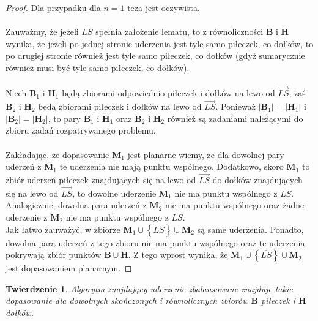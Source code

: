 \documentclass[10pt,a4paper]{article}
\newtheorem{theorem}{Twierdzenie}
\begin{document}
	\begin{proof}
		Dla przypadku dla $n = 1$  teza jest oczywista. \\~\\
		Zauważmy, że jeżeli $LS$ spełnia założenie lematu, to z równoliczności $\mathbf{B}$ i $\mathbf{H}$ wynika, że jeżeli po jednej stronie uderzenia jest tyle samo piłeczek, co dołków, to po drugiej stronie również jest tyle samo piłeczek, co dołków (gdyż sumarycznie również musi być tyle samo piłeczek, co dołków). \\~\\
		Niech $\mathbf{B}_{1}$ i $\mathbf{H}_{1}$ będą zbiorami odpowiednio piłeczek i dołków na lewo od $\overrightarrow{LS}$, zaś $\mathbf{B}_{2}$ i $\mathbf{H}_{2}$ będą zbiorami piłeczek i dołków na lewo od $\overrightarrow{LS}$. Ponieważ $|\mathbf{B}_{1}| = |\mathbf{H}_{1}|$ i $|\mathbf{B}_{2}| = |\mathbf{H}_{2}|$, to pary $\mathbf{B}_{1}$ i $\mathbf{H}_{1}$ oraz $\mathbf{B}_{2}$ i $\mathbf{H}_{2}$ również są zadaniami należącymi do zbioru zadań rozpatrywanego problemu. \\~\\
		Zakładając, że dopasowanie $\mathbf{M}_{1}$ jest planarne wiemy, że dla dowolnej pary uderzeń z $\mathbf{M}_{1}$ te uderzenia nie mają punktu wspólnego. Dodatkowo, skoro $\mathbf{M}_{1}$ to zbiór uderzeń piłeczek znajdujących się na lewo od $\overrightarrow{LS}$ do dołków znajdujących się na lewo od $\overrightarrow{LS}$, to dowolne uderzenie $\mathbf{M}_{1}$ nie ma punktu wspólnego z $\overline{LS}$. Analogicznie, dowolna para uderzeń z $\mathbf{M}_{2}$ nie ma punktu wspólnego oraz żadne uderzenie z $\mathbf{M}_{2}$ nie ma punktu wspólnego z $\overline{LS}$. \\
		Jak łatwo zauważyć, w zbiorze $\mathbf{M}_{1} \cup \left\{\overline{LS}\right\} \cup \mathbf{M}_{2}$ są same uderzenia. Ponadto, dowolna para uderzeń z tego zbioru nie ma punktu wspólnego oraz te uderzenia pokrywają zbiór punktów $\mathbf{B} \cup \mathbf{H}$. Z tego wprost wynika, że $\mathbf{M}_{1} \cup \left\{\overline{LS}\right\} \cup \mathbf{M}_{2}$ jest dopasowaniem planarnym.
	\end{proof}

	\vspace{2em}

	\begin{theorem} \label{theorem:1}
		Algorytm znajdujący uderzenie zbalansowane znajduje takie dopasowanie dla dowolnych skończonych i równolicznych zbiorów $\mathbf{B}$ piłeczek i $\mathbf{H}$ dołków.
	\end{theorem}
\end{document}
